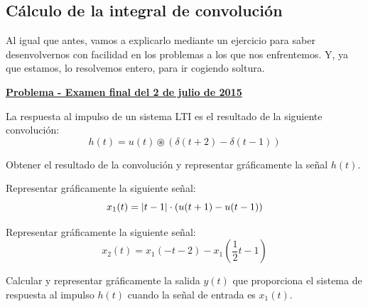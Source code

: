 \documentclass[a4paper]{book}
\begin{document}
\setlength{\leftskip}{0pt}
\setlength{\rightskip}{0pt}

\subsection{Cálculo de la integral de convolución}
Al igual que antes, vamos a explicarlo mediante un ejercicio para saber desenvolvernos con facilidad en los problemas a los que nos enfrentemos. Y, ya que estamos, lo resolvemos entero, para ir cogiendo soltura.
\vspace{\parskip}


\setlength{\leftskip}{0.5cm}
\setlength{\rightskip}{0.5cm}

\underline{\textbf{Problema  - Examen final del 2 de julio de 2015}}\\[\parskip]
\begin{myenumerate}
La respuesta al impulso de un sistema LTI es el resultado de la siguiente convolución:
\[h(t) = u(t) \circledast \left( \delta (t+2) - \delta (t-1) \right)\]
\item  Obtener el resultado de la convolución y representar gráficamente la señal $h(t)$.
\item Representar gráficamente la siguiente señal:
\[x_1(t) = \abs{t-1}\cdot \left( u(t+1) - u(t-1) \right)\]

\item Representar gráficamente la siguiente señal: \[x_2(t) = x_1(-t-2)-x_1\left( \frac{1}{2}t -1 \right)\]

\item Calcular y representar gráficamente la salida $y(t)$ que proporciona el sistema de respuesta al impulso $h(t)$ cuando la señal de entrada es $x_1(t)$.
\end{myenumerate}
\end{document}
